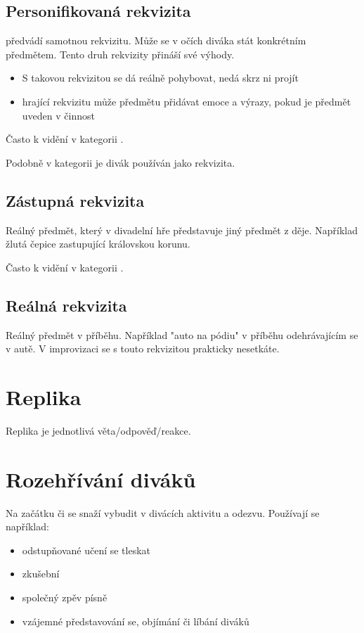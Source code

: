 \subsection{ Personifikovaná rekvizita }  předvádí samotnou rekvizitu. Může se v očích diváka stát konkrétním předmětem. Tento druh rekvizity přináší své výhody.  
 
\begin{itemize}
\item  S takovou rekvizitou se dá reálně pohybovat, nedá skrz ni projít
\item  {} hrající rekvizitu může předmětu přidávat emoce a výrazy, pokud je předmět uveden v činnost
\end{itemize}
 
Často k vidění v kategorii . 
 
Podobně v kategorii  je divák používán jako rekvizita. 
 
\subsection{ Zástupná rekvizita } Reálný předmět, který v divadelní hře představuje jiný předmět z děje. Například žlutá čepice zastupující královskou korunu. 
 
Často k vidění v kategorii . 
 
\subsection{ Reálná rekvizita } Reálný předmět v příběhu. Například "auto na pódiu"{} v příběhu odehrávajícím se v autě. V improvizaci se s touto rekvizitou prakticky nesetkáte. 
 
  
 
 
\needspace{5cm} \section{Replika} \label{replika} Replika je jednotlivá věta/odpověď/reakce. 
 
\needspace{5cm} \section{Rozehřívání diváků} \label{rozehřívání diváků} Na začátku  či  se   snaží vybudit v divácích aktivitu a odezvu. 
Používají se například: 
\begin{itemize}
\item odstupňované učení se tleskat
\item zkušební 
\item společný zpěv písně
\item vzájemné představování se, objímání či líbání diváků
\end{itemize}
 
